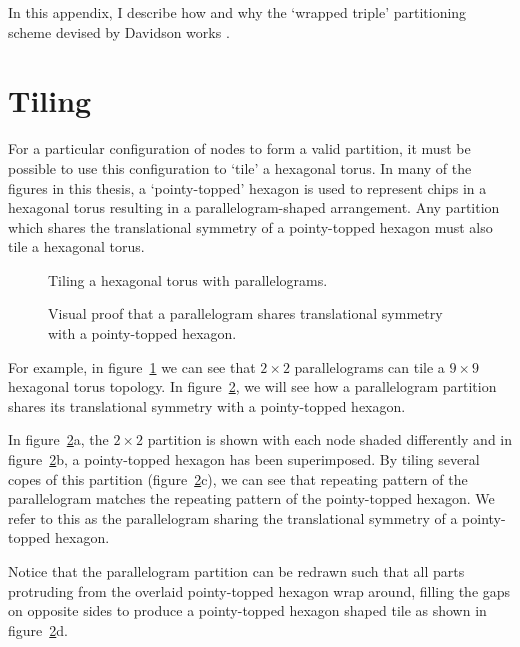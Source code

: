 	In this appendix, I describe how and why the `wrapped triple' partitioning
	scheme devised by Davidson works \cite{davidsonWiring}.
	
	\section{Tiling}
		
		For a particular configuration of nodes to form a valid partition, it must
		be possible to use this configuration to `tile' a hexagonal torus. In many
		of the figures in this thesis, a `pointy-topped' hexagon is used to
		represent chips in a hexagonal torus resulting in a parallelogram-shaped
		arrangement. Any partition which shares the translational symmetry of a
		pointy-topped hexagon must also tile a hexagonal torus.
		
		\begin{figure}
			\center
			
			\caption{Tiling a hexagonal torus with parallelograms.}
			\label{fig:tiling-a-torus}
		 \end{figure}
		 
		 \begin{figure}
			\center
			
			\caption{Visual proof that a parallelogram shares translational symmetry
			with a pointy-topped hexagon.}
			\label{fig:parallelogram-tiling}
		\end{figure}
		
		For example, in figure~\ref{fig:tiling-a-torus} we can see that $2\times2$
		parallelograms can tile a $9\times9$ hexagonal torus topology. In
		figure~\ref{fig:parallelogram-tiling}, we will see how a parallelogram
		partition shares its translational symmetry with a pointy-topped hexagon.
		
		In figure~\ref{fig:parallelogram-tiling}a, the $2\times2$ partition is
		shown with each node shaded differently and in
		figure~\ref{fig:parallelogram-tiling}b, a pointy-topped hexagon has been
		superimposed. By tiling several copes of this partition
		(figure~\ref{fig:parallelogram-tiling}c), we can see that repeating pattern
		of the parallelogram matches the repeating pattern of the pointy-topped
		hexagon. We refer to this as the parallelogram sharing the translational
		symmetry of a pointy-topped hexagon.
		
		Notice that the parallelogram partition can be redrawn such that all parts
		protruding from the overlaid pointy-topped hexagon wrap around, filling the
		gaps on opposite sides to produce a pointy-topped hexagon shaped tile as
		shown in figure~\ref{fig:parallelogram-tiling}d.
		
